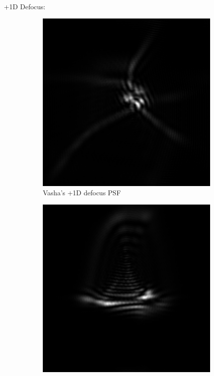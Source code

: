\documentclass{article}
\begin{document}
+1D Defocus:
\begin{figure}[H]
\begin{subfigure}{.3\textwidth}
  \centering
  \includegraphics[width=1\linewidth]{Vasha_R_G_0530_2_500_zer_1_5_PSF.png}
  \caption{Vasha's +1D defocus PSF}
  \label{fig:vasha1dpsf}
\end{subfigure}
\begin{subfigure}{.3\textwidth}
  \centering
  \includegraphics[width=1\linewidth]{Liz_R_G_0523_2_500_zer_1_5_PSF.png}

\end{subfigure}
\end{figure}
\end{document}
